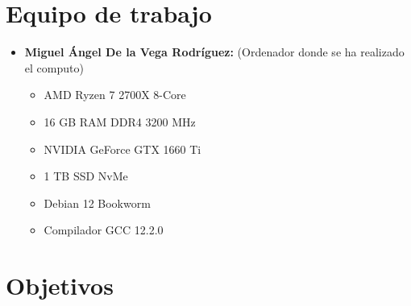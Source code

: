 \documentclass[11pt,openany]{book}
\begin{document}
\chapter{Equipo de trabajo}

\begin{itemize}
      \item \textbf{Miguel Ángel De la Vega Rodríguez:} (Ordenador donde se ha realizado el computo)
            \begin{itemize}
                  \item AMD Ryzen 7 2700X 8-Core
                  \item 16 GB RAM DDR4 3200 MHz
                  \item NVIDIA GeForce GTX 1660 Ti
                  \item 1 TB SSD NvMe
                  \item Debian 12 Bookworm
                  \item Compilador GCC 12.2.0
            \end{itemize}
\end{itemize}

\chapter{Objetivos}
\end{document}
